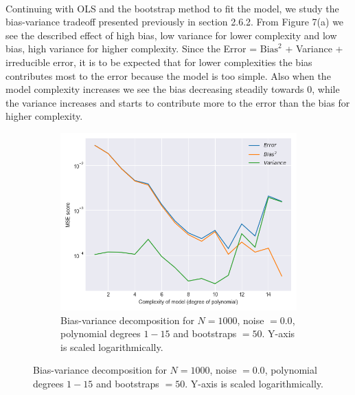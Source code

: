 \documentclass[a4paper,twocolumn]{article}
\begin{document}
\\
Continuing with OLS and the bootstrap method to fit the model, we study the bias-variance tradeoff presented previously in section 2.6.2. From Figure 7(a) we see the described effect of high bias, low variance for lower complexity and low bias, high variance for higher complexity. Since the Error = $\textrm{Bias}^{2}$ + Variance + irreducible error, it is to be expected that for lower complexities the bias contributes most to the error because the model is too simple. Also when the model complexity increases we see the bias decreasing steadily towards 0, while the variance increases and starts to contribute more to the error than the bias for higher complexity.\\
\begin{figure}[ht]
    \centering
    \begin{subfigure}[b]{0.9\columnwidth}
        \includegraphics[width=\columnwidth]{bias_variance_tradeoff_Bootstraps=50_N=1000_Noise=0.0_Degree=1-15.png}
        \caption{Bias-variance decomposition for $N = 1000$, noise $= 0.0$, polynomial degrees $1- 15$ and bootstraps $= 50$. Y-axis is scaled logarithmically.}
    \end{subfigure}
    

\end{figure}
\end{document}
